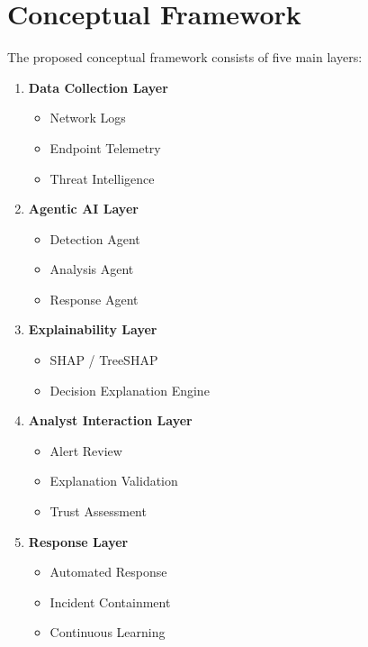 \documentclass[12pt,a4paper]{report}
\begin{document}
\section{Conceptual Framework}
\label{sec:conceptual_framework}

The proposed conceptual framework consists of five main layers:

\begin{enumerate}[label=\arabic*.]
    \item \textbf{Data Collection Layer}
    \begin{itemize}
        \item Network Logs
        \item Endpoint Telemetry
        \item Threat Intelligence
    \end{itemize}
    
    \item \textbf{Agentic AI Layer}
    \begin{itemize}
        \item Detection Agent
        \item Analysis Agent
        \item Response Agent
    \end{itemize}
    
    \item \textbf{Explainability Layer}
    \begin{itemize}
        \item SHAP / TreeSHAP
        \item Decision Explanation Engine
    \end{itemize}
    
    \item \textbf{Analyst Interaction Layer}
    \begin{itemize}
        \item Alert Review
        \item Explanation Validation
        \item Trust Assessment
    \end{itemize}
    
    \item \textbf{Response Layer}
    \begin{itemize}
        \item Automated Response
        \item Incident Containment
        \item Continuous Learning
    \end{itemize}
\end{enumerate}
\end{document}
